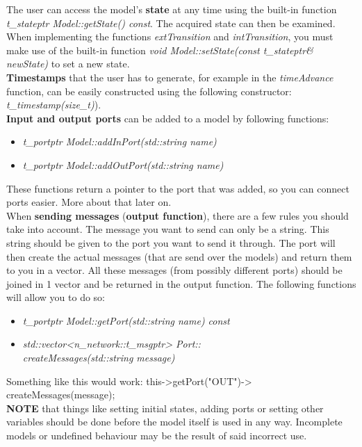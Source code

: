 The user can access the model's \textbf{state} at any time using the built-in function \textsl{t\_stateptr Model::getState() const}. The acquired state can then be examined. When implementing the functions \textsl{extTransition} and \textsl{intTransition}, you must make use of the built-in function \textsl{void Model::setState(const t\_stateptr\& newState)} to set a new state.\\

\textbf{Timestamps} that the user has to generate, for example in the \textsl{timeAdvance} function, can be easily constructed using the following constructor:\\ \textsl{t\_timestamp(size\_t)}).\\

\textbf{Input and output ports} can be added to a model by following functions:
\begin{itemize}
	\item \textsl{t\_portptr Model::addInPort(std::string name)}
	\item \textsl{t\_portptr Model::addOutPort(std::string name)}
\end{itemize}
These functions return a pointer to the port that was added, so you can connect ports easier. More about that later on. \\

When \textbf{sending messages} (\textbf{output function}), there are a few rules you should take into account. The message you want to send can only be a string. This string should be given to the port you want to send it through. The port will then create the actual messages (that are send over the models) and return them to you in a vector. All these messages (from possibly different ports) should be joined in 1 vector and be returned in the output function. The following functions will allow you to do so:
\begin{itemize}
	\item \textsl{t\_portptr Model::getPort(std::string name) const}
	\item \textsl{std::vector{\textless}n\_network::t\_msgptr{\textgreater} Port:: \\createMessages(std::string message)}
\end{itemize} 
Something like this would work: this-{\textgreater}getPort("OUT")-{\textgreater} \\createMessages(message); \\

\textbf{NOTE} that things like setting initial states, adding ports or setting other variables should be done before the model itself is used in any way. Incomplete models or undefined behaviour may be the result of said incorrect use.

